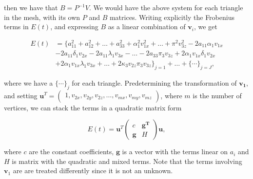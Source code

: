 \documentclass[12pt]{article}
\begin{document}
then we have that $B = P^{-1}V$.
We would have the above system for each triangle in the mesh, with its own $P$ and $B$ matrices.  
Writing explicitly the Frobenius terms in $E(t)$, and expressing $B$ as a linear combination of $\mathbf{v}_i$, we get

\begin{align*}
E(t) &= \lbrace a_{11}^2 + a_{12}^2 + \ldots + a_{33}^2 + \alpha_1^2 v_{1x}^2 + \ldots + \pi^2 v_{3z}^2 - 2 a_{11} \alpha_1 v_{1x} \\
& - 2 a_{11} \delta_1 v_{2x} - 2 a_{11} \lambda_1 v_{3x} - \ldots - 2 a_{33} \pi_3 v_{3z} + 2 \alpha_1 v_{1x} \delta_1 v_{2x} \\ 
& + 2 \alpha_1 v_{1x} \lambda_1 v_{3x} + \ldots + 2 \kappa_3 v_{2z} \pi_3 v_{3z} \rbrace_{j = 1} + \ldots + \lbrace \cdots \rbrace_{j = J},
\end{align*}

where we have a $\lbrace \cdots \rbrace_j$ for each triangle.
Predetermining the transformation of $\mathbf{v_1}$, and setting 
$\mathbf{u}^T = \begin{pmatrix} 1, v_{2x}, v_{2y}, v_{2z}, \ldots, v_{mx}, v_{my}, v_{mz} \end{pmatrix}$, where $m$ is the number of vertices, we can stack the terms in a quadratic matrix form 

\begin{equation*}
E(t) = \mathbf{u}^T  \begin{pmatrix}
c & \mathbf{g^T} \\
\mathbf{g} & H
\end{pmatrix} \mathbf{u},
\end{equation*}

where $c$ are the constant coefficients, $\mathbf{g}$ is a vector with the terms linear on $a_i$ and $H$ is matrix with the quadratic and mixed terms.
Note that the terms involving $\mathbf{v}_1$ are are treated differently since it is not an unknown.
\end{document}
